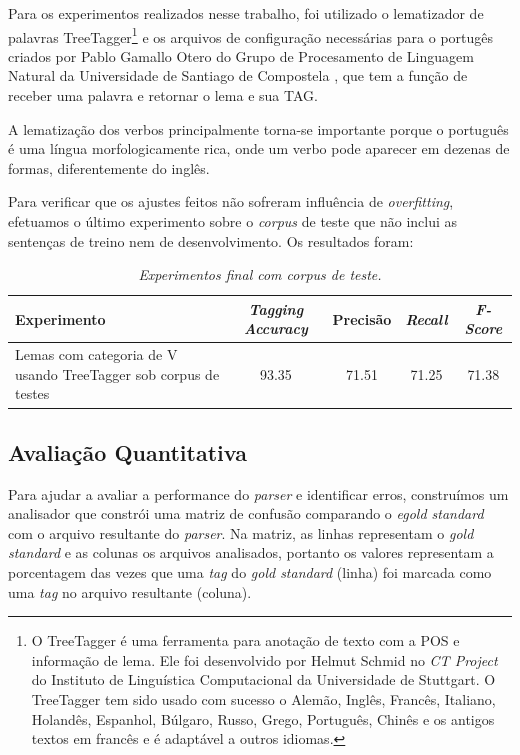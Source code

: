 Para os experimentos realizados nesse trabalho, foi utilizado o lematizador de palavras TreeTagger\footnote{O TreeTagger é uma ferramenta para anotação de texto com a POS e informação de lema. Ele foi desenvolvido por Helmut Schmid no \emph{CT Project} do Instituto de Linguística Computacional da Universidade de Stuttgart. O TreeTagger tem sido usado com sucesso o Alemão, Inglês, Francês, Italiano, Holandês, Espanhol, Búlgaro, Russo, Grego, Português, Chinês e os antigos textos em francês e é adaptável a outros idiomas.} \cite{treetagger} e os arquivos de configuração necessárias para o portugês criados por Pablo Gamallo Otero do Grupo de Procesamento de Linguagem Natural da Universidade de Santiago de Compostela \cite{gamallootero}, que tem a função de receber uma palavra e retornar o lema e sua TAG.

A lematização dos verbos principalmente torna-se importante porque o português é uma língua morfologicamente rica, onde um verbo pode aparecer em dezenas de formas, diferentemente do inglês.

Para verificar que os ajustes feitos não sofreram influência de \emph{overfitting}, efetuamos o último experimento sobre o \emph{corpus} de teste que não inclui as sentenças de treino nem de desenvolvimento. Os resultados foram:

\begin{table}[H]
\centering
\footnotesize
\caption{\it Experimentos final com \emph{corpus} de teste.}
	\begin{tabular}{|p{7cm}|c|c|c|c|}
		\hline
		\textbf{Experimento} &  \textbf{\emph{Tagging Accuracy}} & \textbf{Precisão} & \textbf{\emph{Recall}} & \textbf{\emph{F-Score}} \\
		\hline
		Lemas com categoria de V usando TreeTagger sob corpus de testes & 93.35 & 71.51 & 71.25 & 71.38\\
		\hline		
	\end{tabular}
	\label{tab:experimento_corpus_teste}
\end{table}

\subsection{Avaliação Quantitativa}

Para ajudar a avaliar a performance do \emph{parser} e identificar erros, construímos um analisador que constrói uma matriz de confusão comparando o \emph{egold standard} com o arquivo resultante do \emph{parser}. Na matriz, as linhas representam o \emph{gold standard} e as colunas os arquivos analisados, portanto os valores representam a porcentagem das vezes que uma \emph{tag} do \emph{gold standard} (linha) foi marcada como uma \emph{tag} no arquivo resultante (coluna).

